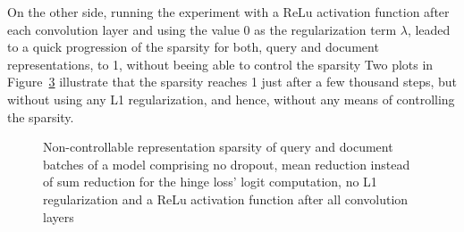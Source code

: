 On the other side, running the experiment with a ReLu activation function after each convolution layer
    and using the value 0 as the regularization term $\lambda$, leaded to a
    quick progression of the sparsity for both, query and document representations, to 1,
    without beeing able to control the sparsity
Two plots in Figure~\ref{fig:2020-03-08:relu-all:cost-fn-query-doc-repr-sparsity} illustrate
    that the sparsity reaches 1 just after a few thousand steps, but without using any
    L1 regularization, and hence, without any means of controlling the sparsity.

\begin{figure}[htbp]
\centering
\begin{subfigure}[b]{0.45\textwidth}
    \centering
    \label{fig:2020-03-08:relu-all:sparsity-query-repr}
\end{subfigure}
\hspace{0.042\textwidth}
\begin{subfigure}[b]{0.45\textwidth}
    \centering
    \label{fig:2020-03-08:relu-all:sparsity-doc-repr}
\end{subfigure}
\caption[Non-controllable sparsity of a model comprising sum reduction for hinge loss' logits computation, no dropout, no L1 regularization and ReLu after all convolution layers]{Non-controllable representation sparsity of query and document batches of a model comprising no dropout, mean reduction instead of sum reduction for the hinge loss' logit computation, no L1 regularization and a ReLu activation function after all convolution layers}
\label{fig:2020-03-08:relu-all:cost-fn-query-doc-repr-sparsity} %
\end{figure}

